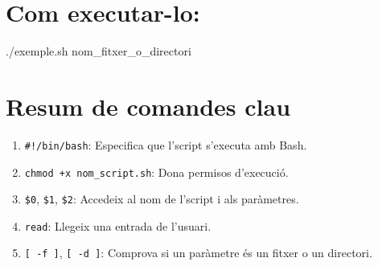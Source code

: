 \documentclass[
  12 pt,
  a4paper,
]{article}
\newenvironment{Shaded}{\begin{snugshade}}{\end{snugshade}}
\newcommand{\BuiltInTok}[1]{#1}
\newcommand{\CommentTok}[1]{\textcolor[rgb]{0.56,0.35,0.01}{\textit{#1}}}
\newcommand{\ControlFlowTok}[1]{\textcolor[rgb]{0.13,0.29,0.53}{\textbf{#1}}}
\newcommand{\ExtensionTok}[1]{#1}
\newcommand{\KeywordTok}[1]{\textcolor[rgb]{0.13,0.29,0.53}{\textbf{#1}}}
\newcommand{\NormalTok}[1]{#1}
\newcommand{\OperatorTok}[1]{\textcolor[rgb]{0.81,0.36,0.00}{\textbf{#1}}}
\newcommand{\OtherTok}[1]{\textcolor[rgb]{0.56,0.35,0.01}{#1}}
\newcommand{\StringTok}[1]{\textcolor[rgb]{0.31,0.60,0.02}{#1}}
\newcommand{\VariableTok}[1]{\textcolor[rgb]{0.00,0.00,0.00}{#1}}
\providecommand{\tightlist}{%
  \setlength{\itemsep}{0pt}\setlength{\parskip}{0pt}}
\begin{document}
\begin{Shaded}
\end{Shaded}

\section{Com executar-lo:}\label{com-executar-lo-1}

\begin{Shaded}
\begin{Highlighting}[]
\ExtensionTok{./exemple.sh}\NormalTok{ nom\_fitxer\_o\_directori}
\end{Highlighting}
\end{Shaded}

\section{Resum de comandes clau}\label{resum-de-comandes-clau}

\begin{enumerate}
\def\labelenumi{\arabic{enumi}.}
\tightlist
\item
  \texttt{\#!/bin/bash}: Especifica que l'script s'executa amb Bash.\\
\item
  \texttt{chmod\ +x\ nom\_script.sh}: Dona permisos d'execució.\\
\item
  \texttt{\$0}, \texttt{\$1}, \texttt{\$2}: Accedeix al nom de l'script
  i als paràmetres.\\
\item
  \texttt{read}: Llegeix una entrada de l'usuari.\\
\item
  \texttt{{[}\ -f\ {]}}, \texttt{{[}\ -d\ {]}}: Comprova si un paràmetre
  és un fitxer o un directori.
\end{enumerate}
\end{document}
